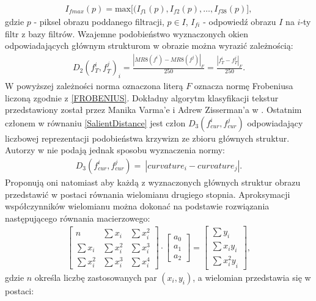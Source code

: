 \documentclass[12pt, twoside, openany]{report}
\theoremstyle{definition}
\begin{document}
\begin{align}
I_{fmax}(p)=\mathrm{max}\big[(I_{f1}(p),I_{f2}(p),\dots ,I_{f38}(p) \big],
\end{align}
gdzie $p$ - piksel obrazu poddanego filtracji, $p\in I$, $I_{fi}$ - odpowiedź obrazu $I$ na $i$-ty filtr z bazy filtrów. Wzajemne podobieństwo wyznaczonych okien odpowiadających głównym strukturom w obrazie można wyrazić zależnością:
\begin{align}
D_2{\left(f^i_T,f^j_T\right)}_i=\frac{{\left|MR8\left(f^i\right)-MR8\left(f^j\right)\right|}_F}{250}=\frac{{\left|f^i_T-f^j_T\right|}_F}{250}.
\end{align}
W powyższej zależności norma oznaczona literą $F$ oznacza normę Frobeniusa liczoną zgodnie z \eqref{FROBENIUS}.
Dokładny algorytm klasyfikacji tekstur przedstawiony został przez Manika Varma'e i Adrew Zisserman'a w \cite{varma2009statistical}. Ostatnim członem w równaniu \eqref{SalientDistance} jest człon $D_3\left(f^i_{cur},f^j_{cur}\right)$ odpowiadający liczbowej reprezentacji podobieństwa krzywizn ze zbioru głównych struktur. Autorzy w \cite{SalientStrucTexProp} nie podają jednak sposobu wyznaczenia normy:
\begin{align}
D_3\left(f^i_{cur},f^j_{cur}\right)=\ \left|curvature_i-curvature_j\right|.
\end{align}
Proponują oni natomiast aby każdą z wyznaczonych głównych struktur obrazu przedstawić w postaci równania wielomianu drugiego stopnia. Aproksymacji współczynników wielomianu można dokonać na podstawie rozwiązania następującego równania macierzowego:
\begin{align}
\left[ \begin{array}{ccc}
n & \sum{x_i} & \sum{x^2_i} \\ 
\sum{x_i} & \sum{x^2_i} & \sum{x^3_i} \\ 
\sum{x^2_i} & \sum{x^3_i} & \sum{x^4_i} \end{array}
\right]\cdot \left[ \begin{array}{c}
a_0 \\ 
a_1 \\ 
a_2 \end{array}
\right]=\left[ \begin{array}{c}
\sum{y_i} \\ 
\sum{x_iy_i} \\ 
\sum{{x^2_iy}_i} \end{array}
\right],
\end{align}
gdzie $n$ określa liczbę zastosowanych par $(x_i,y_i)$, a wielomian przedstawia się w postaci:
\end{document}
